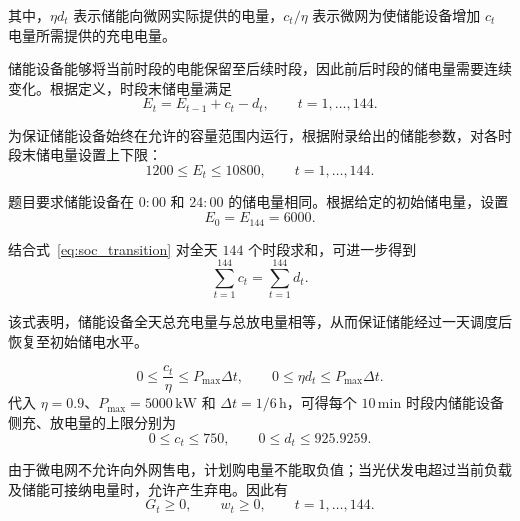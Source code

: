 其中，$\eta d_t$ 表示储能向微网实际提供的电量，$c_t/\eta$ 表示微网为使储能设备增加 $c_t$ 电量所需提供的充电电量。


储能设备能够将当前时段的电能保留至后续时段，因此前后时段的储电量需要连续变化。根据定义，时段末储电量满足
\begin{equation}
E_t=E_{t-1}+c_t-d_t,
\qquad t=1,\ldots,144.
\label{eq:soc_transition}
\end{equation}


为保证储能设备始终在允许的容量范围内运行，根据附录给出的储能参数，对各时段末储电量设置上下限：
\begin{equation}
1200\le E_t\le10800,
\qquad t=1,\ldots,144.
\label{eq:q1_capacity}
\end{equation}


题目要求储能设备在 $0{:}00$ 和 $24{:}00$ 的储电量相同。根据给定的初始储电量，设置
\begin{equation}
E_0=E_{144}=6000.
\label{eq:soc_terminal}
\end{equation}

结合式~\eqref{eq:soc_transition} 对全天 $144$ 个时段求和，可进一步得到
\begin{equation}
\sum_{t=1}^{144}c_t
=
\sum_{t=1}^{144}d_t.
\label{eq:daily_energy_balance}
\end{equation}

该式表明，储能设备全天总充电量与总放电量相等，从而保证储能经过一天调度后恢复至初始储电水平。

\begin{equation}
0\le\frac{c_t}{\eta}\le P_{\max}\Delta t,
\qquad
0\le\eta d_t\le P_{\max}\Delta t.
\label{eq:q1_power}
\end{equation}
代入 $\eta=0.9$、$P_{\max}=5000\,\mathrm{kW}$ 和 $\Delta t=1/6\,\mathrm{h}$，可得每个 $10\,\mathrm{min}$ 时段内储能设备侧充、放电量的上限分别为
\begin{equation}
0\le c_t\le750,
\qquad
0\le d_t\le925.9259.
\label{eq:q1_power_equiv}
\end{equation}


由于微电网不允许向外网售电，计划购电量不能取负值；当光伏发电超过当前负载及储能可接纳电量时，允许产生弃电。因此有
\begin{equation}
G_t\ge0,\qquad w_t\ge0,
\qquad t=1,\ldots,144.
\label{eq:q1_nonnegative}
\end{equation}

